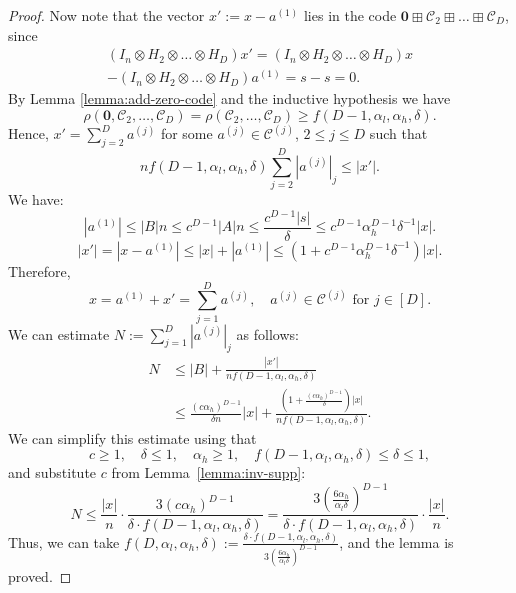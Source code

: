 \documentclass[10pt,a4paper]{amsart}
\let\ge\geqslant
\let\le\leqslant
\newcommand{\cC}{\mathcal{C}}
\newcommand{\rbr}[1]{\left(#1\right)}
\begin{document}
\begin{proof}
Now note that the vector $x':=x-a^{(1)}$ lies in the code $\mathbf{0}\boxplus \cC_2\boxplus\dots\boxplus \cC_D$, since \begin{multline*}
    (I_n\otimes H_2\otimes \dots\otimes H_D)x'=(I_n\otimes  H_2\otimes \dots\otimes H_D)x\\
    -(I_n\otimes H_2\otimes \dots\otimes H_D)a^{(1)}=s-s=0.
\end{multline*}
By Lemma \ref{lemma:add-zero-code} and the inductive hypothesis we have \[
    \rho(\mathbf{0},\cC_2,\dots, \cC_D)
    =\rho(\cC_2,\dots, \cC_D)
    \ge f(D-1,\alpha_l,\alpha_h,\delta).
\]
Hence, $x'=\sum_{j=2}^D a^{(j)}$ for some $a^{(j)}\in \cC^{(j)}$, $2\le j\le D$ such that \[
    n f(D-1,\alpha_l,\alpha_h,\delta)\sum_{j=2}^D |a^{(j)}|_j\le |x'|.
\]
We have: \[
    |a^{(1)}|
    \le |B|n
    \le c^{D-1}|A|n
    \le \frac{c^{D-1}|s|}{\delta}
    \le c^{D-1}\alpha_h^{D-1}\delta^{-1}|x|.
\] \[  
    |x'|=|x-a^{(1)}|
    \le |x|+|a^{(1)}|
    \le \rbr{1+c^{D-1}\alpha_h^{D-1}\delta^{-1}}|x|.
\]
Therefore, \[
    x=a^{(1)}+x'=\sum_{j=1}^D a^{(j)}, \quad 
    a^{(j)}\in \cC^{(j)}\mbox{ for }j\in [D].
\]
We can estimate $N:=\sum_{j=1}^D |a^{(j)}|_j$ as follows: 
\begin{align*}
    N &\le |B|+\frac{|x'|}{nf(D-1,\alpha_l,\alpha_h,\delta)}\\
    &\le \frac{(c\alpha_h)^{D-1}}{\delta  n}|x| + \frac{\rbr{1+\frac{(c\alpha_h)^{D-1}}{\delta}}|x|}{nf(D-1,\alpha_l,\alpha_h,\delta)}.
\end{align*}
We can simplify this estimate using that \[
c\ge 1,\quad \delta\le 1,\quad \alpha_h\ge 1,\quad f(D-1,\alpha_l,\alpha_h,\delta)\le\delta\le 1,
\]
and substitute $c$ from Lemma~\ref{lemma:inv-supp}:\[
    N\le \frac{|x|}{n}\cdot\frac{3(c\alpha_h)^{D-1}}{\delta\!\cdot\! f(D-1,\alpha_l,\alpha_h,\delta)}
    =\frac{3\rbr{\frac{6\alpha_h}{\alpha_l\delta}}^{D-1}}{\delta\!\cdot\! f(D-1,\alpha_l,\alpha_h,\delta)}\cdot \frac{|x|}{n}.
\]
Thus, we can take $f(D,\alpha_l,\alpha_h,\delta):=\frac{\delta \cdot f(D-1,\alpha_l,\alpha_h,\delta)}{3\rbr{\frac{6\alpha_h}{\alpha_l\delta}}^{D-1}}$, and the lemma is proved.
\end{proof}
\end{document}
